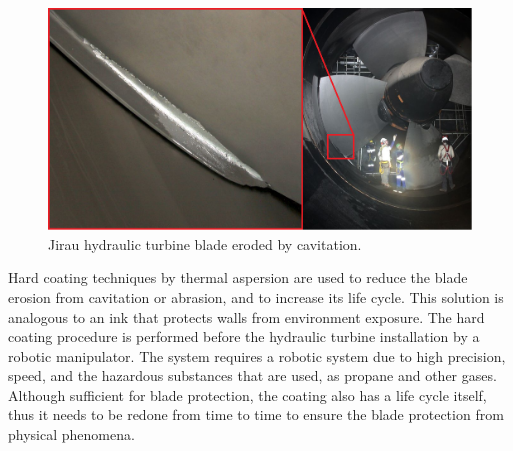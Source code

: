 \begin{figure}[h!]	
	\includegraphics[width=\columnwidth]{figs/intro/cavitacao2}
	\caption{Jirau hydraulic turbine blade eroded by cavitation.}
	\label{fig::cavitacao}
\end{figure}

Hard coating techniques by thermal aspersion
are used to reduce the blade erosion from cavitation or abrasion,
and to increase its life cycle. This solution is analogous to an ink that
protects walls from environment exposure. The hard coating procedure is performed
before the hydraulic turbine installation by a robotic manipulator. The system
requires a robotic system due to high precision, speed, and
the hazardous substances that are used, as propane and other gases.
Although sufficient for blade protection, the coating also has a life
cycle itself, thus it needs to be redone from time to time to ensure the
blade protection from physical phenomena.

